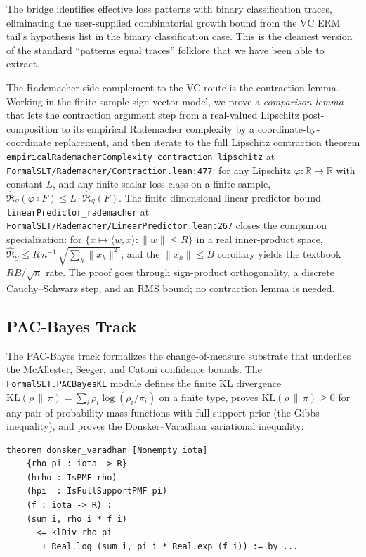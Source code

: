 \documentclass[sigplan,anonymous,review,screen]{acmart}
\newcommand{\Rad}{\widehat{\mathfrak{R}}}
\newcommand{\KL}{\mathrm{KL}}
\newcommand{\R}{\mathbb{R}}
\begin{document}
The bridge identifies effective loss patterns with binary classification
traces, eliminating the user-supplied combinatorial growth bound from
the VC ERM tail's hypothesis list in the binary classification case.
This is the cleanest version of the standard ``patterns equal traces''
folklore that we have been able to extract.

The Rademacher-side complement to the VC route is the contraction
lemma. Working in the finite-sample sign-vector model, we prove a
\emph{comparison lemma} that lets the contraction argument step from a
real-valued Lipschitz post-composition to its empirical Rademacher
complexity by a coordinate-by-coordinate replacement, and then iterate
to the full Lipschitz contraction theorem
\texttt{empiricalRademacherComplexity\_contraction\_lipschitz} at
\texttt{FormalSLT/Rademacher/Contraction.lean:477}: for any Lipschitz
$\varphi : \R \to \R$ with constant $L$, and any finite scalar loss
class on a finite sample,
$\Rad_S(\varphi \circ F) \le L \cdot \Rad_S(F)$. The
finite-dimensional linear-predictor bound
\texttt{linearPredictor\_rademacher} at
\texttt{FormalSLT/Rademacher/LinearPredictor.lean:267} closes the
companion specialization: for $\{x \mapsto \langle w, x\rangle :
\|w\| \le R\}$ in a real inner-product space,
$\Rad_S \le R\, n^{-1}\,\sqrt{\sum_k \|x_k\|^2}$, and the
$\|x_k\| \le B$ corollary yields the textbook $RB/\sqrt{n}$ rate. The
proof goes through sign-product orthogonality, a discrete
Cauchy--Schwarz step, and an RMS bound; no contraction lemma is needed.

\subsection{PAC-Bayes Track}
\label{sec:pacbayes}

The PAC-Bayes track formalizes the change-of-measure substrate that
underlies the McAllester, Seeger, and Catoni confidence bounds. The
\texttt{FormalSLT.PACBayesKL} module defines the finite KL divergence
$\KL(\rho \,\|\, \pi) = \sum_i \rho_i \log(\rho_i / \pi_i)$ on a
finite type, proves $\KL(\rho \,\|\, \pi) \ge 0$ for any pair of
probability mass functions with full-support prior (the Gibbs
inequality), and proves the Donsker--Varadhan variational inequality:

\begin{lstlisting}[caption={Donsker--Varadhan variational inequality
                  (\texttt{FormalSLT/PACBayesKL.lean:235}).},
                  label={lst:dv}]
theorem donsker_varadhan [Nonempty iota]
    {rho pi : iota -> R}
    (hrho : IsPMF rho)
    (hpi  : IsFullSupportPMF pi)
    (f : iota -> R) :
    (sum i, rho i * f i)
      <= klDiv rho pi
       + Real.log (sum i, pi i * Real.exp (f i)) := by ...
\end{lstlisting}
\end{document}
